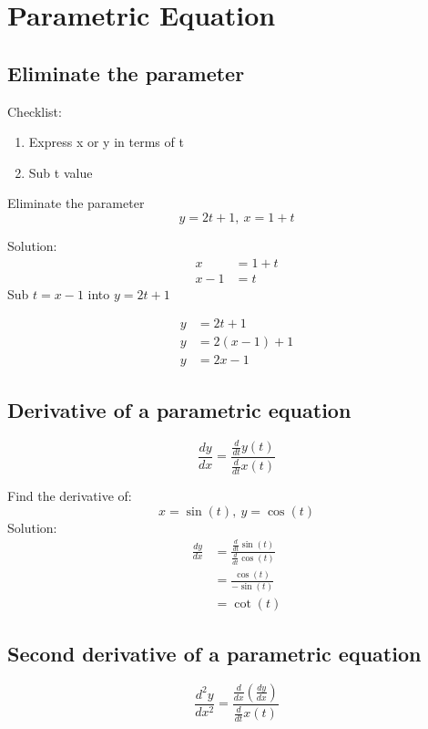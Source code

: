 \section{Parametric Equation}

\subsection{Eliminate the parameter}
Checklist:
\begin{enumerate}
    \item Express x or y in terms of t
    \item Sub t value 
\end{enumerate}

\begin{simple}{}{}
Eliminate the parameter
$$y=2t+1,\ x=1+t$$

Solution:
\begin{align*}
    x&=1+t\\
    x-1&=t
\end{align*}
Sub $t=x-1$ into $y=2t+1$

\begin{align*}
    y&=2t+1\\
    y&=2(x-1)+1\\
    y&=2x-1
\end{align*}
\end{simple}

\subsection{Derivative of a parametric equation}
\begin{equation}
    \frac{dy}{dx}=\frac{\frac{d}{dt}y(t)}{\frac{d}{dt}x(t)}
\end{equation}

\begin{simple}{}{}
Find the derivative of:
$$x=\sin{(t)},\ y=\cos{(t)}$$
Solution:
\begin{align*}
    \frac{dy}{dx}&=\frac{\frac{d}{dt}\sin{(t)}}{\frac{d}{dt}\cos{(t)}}\\
    &=\frac{\cos{(t)}}{-\sin{(t)}}\\
    &=\cot{(t)}
\end{align*}
\end{simple}

\subsection{Second derivative of a parametric equation}
\begin{equation}
    \frac{d^2y}{dx^2}=\frac{\frac{d}{dx}\left(\frac{dy}{dx}\right)}{\frac{d}{dt}x(t)}
\end{equation}


